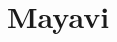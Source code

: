 \begin{comment} %
\begin{table} %
\centering
\begin{tabular}{|l|p{7cm}|p{3cm}|}
    \hline
    Function & Description & Usage\\
    \hline
    \li{bar} & makes a bar graph & bar(left,height)\\
    \li{barh} & makes a horizontal bar graph & barh(bottom,width)\\
    \li{fill} & plots lines with shading under the curve & fill(x,y)\\
    \li{fill\_between} & plots lines with shading between two given y
    values & fill\_ between(x,y1, y2=0)\\
    \li{hist} & plots a histogram from data & hist(data)\\
    \li{pie} & makes a pie chart & pie(x)\\
    \li{plot} & plots lines and data on standard axes & plot(x,y)\\
    \li{polar} & plots lines and data on polar axes & polar(theta,r)\\
    \li{loglog} & plots lines and data on logarithmic x and y axes &
    loglog(x,y)\\
    \li{scatter} & plots data, has more options for scatter plots than
    the plot function & scatter(x,y)\\
    \li{semilogx} & plots lines and data with a log scaled x axis &
    semilogx(x,y)\\
    \li{semilogy} & plots lines and data with a log scaled y axis &
    semilogy(x,y)\\
    \li{specgram} & makes a spectogram from data & specgram(x)\\
    \li{spy} & plots the sparsity pattern of a 2D array & spy(Z)\\
    \li{triplot} & plots triangulation between given points &
    triplot(x,y)\\
\end{tabular}
\end{center}
\caption{Some basic functions in Matplotlib.}
\label{mpl:basics}
\end{table}
\end{comment}

\section*{Mayavi} %

